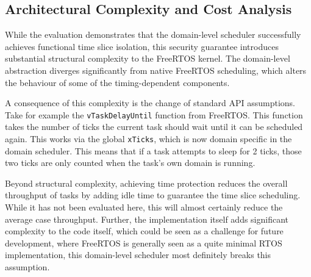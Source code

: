 \subsection{Architectural Complexity and Cost Analysis}
While the evaluation demonstrates that the domain-level scheduler successfully
achieves functional time slice isolation, this security guarantee introduces
substantial structural complexity to the FreeRTOS kernel. The domain-level
abstraction diverges significantly from native FreeRTOS scheduling, which
alters the behaviour of some of the timing-dependent components.

A consequence of this complexity is the change of standard API assumptions.
Take for example the \texttt{vTaskDelayUntil} function from FreeRTOS. This
function takes the number of ticks the current task should wait until it can be
scheduled again. This works via the global \texttt{xTicks}, which is now domain
specific in the domain scheduler. This means that if a task attempts to sleep
for 2 ticks, those two ticks are only counted when the task's own domain is
running.

Beyond structural complexity, achieving time protection reduces the overall
throughput of tasks by adding idle time to guarantee the time slice scheduling.
While it has not been evaluated here, this will almost certainly reduce the
average case throughput. Further, the implementation itself adds significant
complexity to the code itself, which could be seen as a challenge for future
development, where FreeRTOS is generally seen as a quite minimal RTOS
implementation, this domain-level scheduler most definitely breaks this
assumption.
